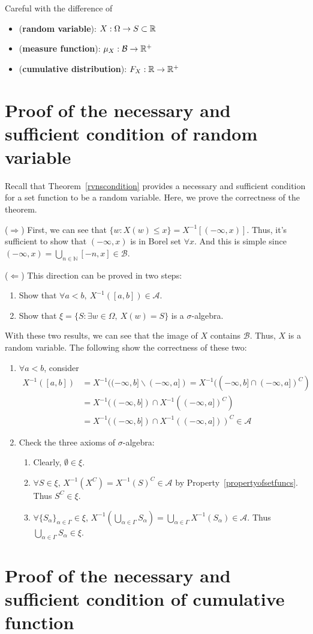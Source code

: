 \documentclass[11pt]{article}
\begin{document}
\begin{intuition}
	Careful with the difference of 
	\begin{itemize}
		\item ({\bf random variable}): $X:\Omega\rightarrow S\subset{\mathbb R}$
		\item ({\bf measure function}): $\mu_X:\mathcal{B}\rightarrow{\mathbb R}^+$
		\item ({\bf cumulative distribution}): $F_X:{\mathbb R}\rightarrow{\mathbb R}^+$
	\end{itemize}
\end{intuition}


\appendix
\section{Proof of the necessary and sufficient condition of random variable}\label{sec:proofrvnscondition}
Recall that Theorem~\ref{rvnscondition} provides a necessary and sufficient condition for a set function to be a random variable. Here, we prove the correctness of the theorem.

($\Rightarrow$) First, we can see that $\{w:X(w)\leq x\} = X^{-1}[(-\infty,x)]$. Thus, it's sufficient to show that $(-\infty,x)$ is in Borel set $\forall x$. And this is simple since $(-\infty,x) = \bigcup_{n\in\mathbb{N}}[-n,x]\in\mathcal{B}$.

($\Leftarrow$) This direction can be proved in two steps:
\begin{enumerate}
	\item Show that $\forall a<b,\ X^{-1}([a,b])\in\mathcal{A}$.
	\item Show that $\xi = \{S:\exists w\in\Omega,\ X(w)=S \}$ is a $\sigma$-algebra.
\end{enumerate}
With these two results, we can see that the image of $X$ contains $\mathcal{B}$. Thus, $X$ is a random variable. The following show the correctness of these two:
\begin{enumerate}
	\item $\forall a<b$, consider
	\begin{align*}
	X^{-1}([a,b]) &= X^{-1}((-\infty,b]\backslash(-\infty,a]) = X^{-1}((-\infty,b]\cap(-\infty,a])^C)\\
	&= X^{-1}((-\infty,b]) \cap X^{-1}((-\infty,a])^C)\\
	&=  X^{-1}((-\infty,b]) \cap X^{-1}((-\infty,a]))^C\in\mathcal{A}
	\end{align*}
	\item Check the three axioms of $\sigma$-algebra:
	\begin{enumerate}
		\item Clearly, $\emptyset\in\xi$.
		\item $\forall S\in\xi$, $X^{-1}(X^C) = X^{-1}(S)^C\in\mathcal{A}$ by Property~\ref{propertyofsetfuncs}. Thus $S^C\in\xi$.
		\item $\forall \{S_{\alpha}\}_{\alpha\in\Gamma}\in\xi$, $X^{-1}(\bigcup_{\alpha\in\Gamma}S_{\alpha}) = \bigcup_{\alpha\in\Gamma}X^{-1}(S_{\alpha})\in\mathcal{A}$. Thus $\bigcup_{\alpha\in\Gamma}S_{\alpha}\in\xi$.
	\end{enumerate}
\end{enumerate}


\section{Proof of the necessary and sufficient condition of cumulative function}\label{sec:proofcfnscondition}
\end{document}
